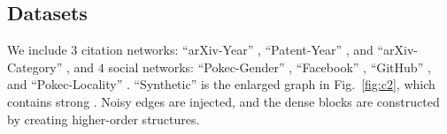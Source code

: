 \subsection{Datasets} \label{ssec:datasets}

We include $3$ citation networks: ``arXiv-Year'' \cite{hu2020open}, ``Patent-Year'' \cite{leskovec2005graphs}, and ``arXiv-Category'' \cite{wang2020microsoft}, 
and $4$ social networks: ``Pokec-Gender'' \cite{takac2012data}, ``Facebook'' \cite{rozemberczki2019multiscale}, ``GitHub'' \cite{rozemberczki2019multiscale}, and ``Pokec-Locality'' \cite{takac2012data}.
``Synthetic'' is the enlarged graph in Fig.~\ref{fig:c2}, which contains strong \xophily \nef. 
Noisy edges are injected, and the dense blocks are constructed by creating higher-order structures.


